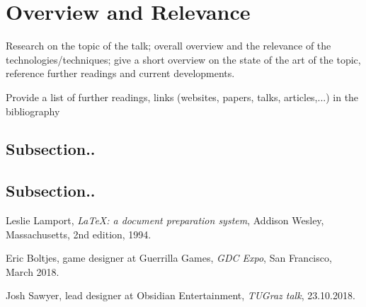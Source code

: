 \documentclass[a4paper]{article}
\begin{document}
\section{Overview and Relevance}
Research on the topic of the talk; overall overview and the relevance of the technologies/techniques; give a short overview on the state of the art of the topic, reference further readings and current developments. 

Provide a list of further readings, links (websites, papers, talks, articles,...) in the bibliography  

\subsection{Subsection..}
\subsection{Subsection..}

\renewcommand{\refname}{\section{References and Further Sources}}
\begin{thebibliography}{1}

  Leslie Lamport,
  \emph{\LaTeX: a document preparation system},
  Addison Wesley, Massachusetts,
  2nd edition,
  1994.

  Eric Boltjes, game designer at Guerrilla Games,
  \emph{GDC Expo},
  San Francisco,
  March 2018.

  Josh Sawyer, lead designer at Obsidian Entertainment,
  \emph{TUGraz talk},
  23.10.2018.

\end{thebibliography}
\end{document}
